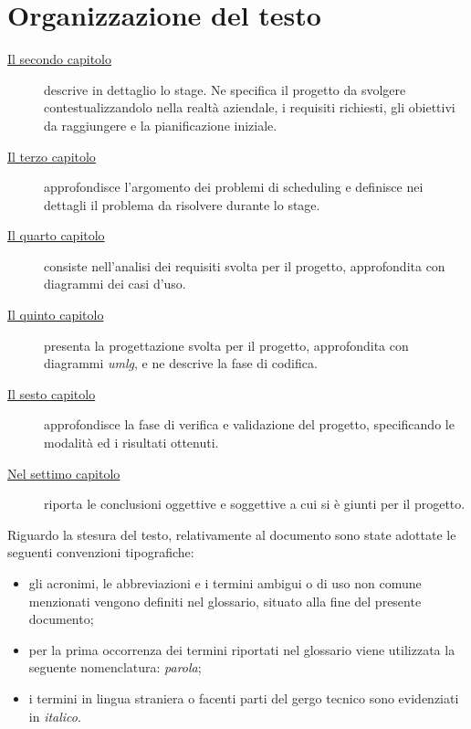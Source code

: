 \section{Organizzazione del testo}

\begin{description}
    \item[{\hyperref[cap:descrizione-stage]{Il secondo capitolo}}] descrive in dettaglio lo stage. Ne specifica il progetto da svolgere contestualizzandolo nella realtà aziendale, i requisiti richiesti, gli obiettivi da raggiungere e la pianificazione iniziale.
    
    \item[{\hyperref[cap:definizione-problema]{Il terzo capitolo}}] approfondisce l'argomento dei problemi di scheduling e definisce nei dettagli il problema da risolvere durante lo stage.
    
    \item[{\hyperref[cap:analisi-requisiti]{Il quarto capitolo}}] consiste nell'analisi dei requisiti svolta per il progetto, approfondita con diagrammi dei casi d'uso.
    
    \item[{\hyperref[cap:progettazione-codifica]{Il quinto capitolo}}] presenta la progettazione svolta per il progetto, approfondita con diagrammi \emph{\gls{umlg}}\glsfirstoccur, e ne descrive la fase di codifica.
    
    \item[{\hyperref[cap:verifica-validazione]{Il sesto capitolo}}] approfondisce la fase di verifica e validazione del progetto, specificando le modalità ed i risultati ottenuti.
    
    \item[{\hyperref[cap:conclusioni]{Nel settimo capitolo}}]
    riporta le conclusioni oggettive e soggettive a cui si è giunti per il progetto.
\end{description}

\noindent
Riguardo la stesura del testo, relativamente al documento sono state adottate le seguenti convenzioni tipografiche:
\begin{itemize}
	\item gli acronimi, le abbreviazioni e i termini ambigui o di uso non comune menzionati vengono definiti nel glossario, situato alla fine del presente documento;
	\item per la prima occorrenza dei termini riportati nel glossario viene utilizzata la seguente nomenclatura: \emph{parola}\glsfirstoccur;
	\item i termini in lingua straniera o facenti parti del gergo tecnico sono evidenziati in \emph{italico}.
\end{itemize}